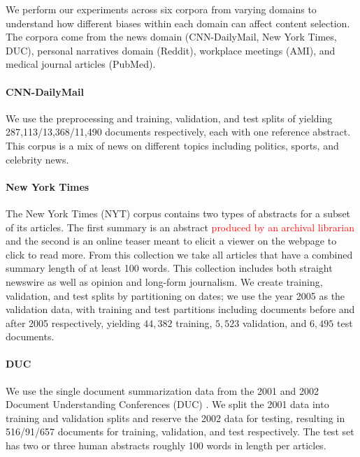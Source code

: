 We perform our experiments across six corpora from varying domains to 
understand how different biases within each domain can affect content 
selection. The corpora come from the news domain
(CNN-DailyMail, New York Times, DUC), personal narratives domain (Reddit),
workplace meetings (AMI), and medical journal articles (PubMed).

\paragraph{CNN-DailyMail} We use the preprocessing and training, validation, 
and test splits
of \cite{see2017get} yielding 287,113/13,368/11,490 documents respectively, each with one reference
abstract. This corpus is a mix of news on different topics including politics,
sports, and celebrity news.

\paragraph{New York Times}{The New York Times (NYT) corpus \cite{sandhaus2008new} contains
 two types of abstracts for a subset of its articles. The first summary is
an abstract \textcolor{red}{produced by an archival librarian} and the 
second is an online teaser meant to elicit a viewer on the webpage to
click to read more. From this collection we take all articles that have 
a combined summary length of at least 100 words. This collection
includes both straight newswire as well as opinion and long-form journalism.
We create training, validation, and test splits by partitioning on dates;
we use the year 2005 as the validation data, with training and test partitions
including documents before and after 2005 respectively,
yielding $44,382$ training, $5,523$ validation, and $6,495$ test documents.}

\paragraph{DUC}{We use the single document summarization data from the 2001
and 2002
Document Understanding Conferences (DUC) \cite{over2002introduction}. We split the 2001 data into training
and validation splits and reserve the 2002 data for testing, resulting in
516/91/657 documents for training, validation, and test respectively. 
The test set has two or three human abstracts roughly 100 words in length per 
articles.}

